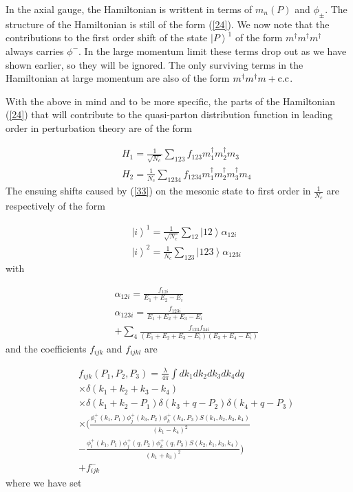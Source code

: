 \documentclass[showpacs,twocolumn,aps,preprintnumbers,letterpaper]{revtex4}
\newcommand{\be}{\begin{equation}}
\newcommand{\ee}{\end{equation}}
\def\be{\begin{eqnarray}}
\def\ee{\end{eqnarray}}
\begin{document}
In the axial gauge, the Hamiltonian is writtent in
terms of  $m_n(P)$ and $\phi_{\pm}$. The structure of the Hamiltonian is still of the form (\ref{24}).
We now note that the contributions to the first order shift of the state $\left|P\right>^1$ of the form
$m^{\dagger}m^{\dagger}m^{\dagger}$ always carries $\phi^{-}$. In the large momentum limit these
terms drop out as we have shown earlier, so they will be ignored. The only surviving
terms in the Hamiltonian at large momentum are also of the form $m^{\dagger}m^{\dagger}m+{\rm c.c}$.  

With the above in mind and to be more specific, the parts of the Hamiltonian (\ref{24}) that will 
contribute to the quasi-parton distribution function in leading order in perturbation theory are
of the form

\be
\label{33}
&&H_{1}=\frac{1}{\sqrt{N_c}}\sum_{123}f_{123}m_1^{\dagger}m_2^{\dagger}m_3\nonumber\\
&&H_{2}=\frac{1}{N_c}\sum_{1234}f_{1234}m_1^{\dagger}m_2^{\dagger}m_3^{\dagger}m_4
\ee
The ensuing shifts caused by (\ref{33}) on the mesonic state  to first order in $\frac{1}{N_c}$
are respectively of the form 


\be
\label{34}
&&\left|i\right>^{1}=\frac{1}{\sqrt{N_c}}\sum_{12}\left|12\right>\alpha_{12i}\nonumber\\
&&\left|i\right>^{2}=\frac{1}{N_c}\sum_{123}\left|123\right>\alpha_{123i}
\ee
with

\be
\label{35}
&&\alpha_{12i}=\frac{f_{12i}}{E_1+E_2-E_i}\nonumber\\
&&\alpha_{123i}=\frac{f_{123i}}{E_1+E_2+E_3-E_i}\nonumber \\ 
&&+\sum_4 \frac{f_{123}f_{34i}}{(E_1+E_2+E_3-E_i)(E_3+E_4-E_i)}
\ee
and the coefficients $f_{ijk}$ and $f_{ijkl}$ are 

\be
\label{36}
&&f_{ijk}(P_1,P_2,P_3)= \frac{\lambda}{4\pi}\int dk_1dk_2dk_3dk_4dq \nonumber \\
&&\times\delta(k_1+k_2+k_3-k_4) \nonumber \\
&&\times \delta(k_1+k_2-P_1)\delta(k_3+q-P_2)\delta(k_4+q-P_3)\nonumber \\
&&\times\bigg( \frac{\phi^{+}_i(k_1,P_1)\phi^{+}_j(k_3,P_2)\phi^{+}_k(k_4,P_3)S(k_1,k_2,k_3,k_4)}{(k_1-k_4)^2}\nonumber \\
&& -\frac{\phi^{+}_i(k_1,P_1)\phi^{+}_j(q,P_2)\phi^{+}_k(q,P_3)S(k_2,k_1,k_3,k_4)}{(k_1+k_3)^2}\bigg)\nonumber \\ 
&&+ f_{ijk}^{-}
\ee
where  we have set 
\end{document}
